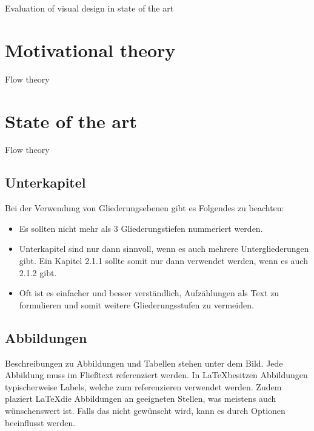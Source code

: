 Evaluation of visual design in state of the art

\section{Motivational theory}

Flow theory

\section{State of the art}

Flow theory

\subsection{Unterkapitel}

Bei der Verwendung von Gliederungsebenen gibt es Folgendes zu beachten:
\begin{itemize}
	\item Es sollten nicht mehr als 3 Gliederungstiefen nummeriert werden.
	\item Unterkapitel sind nur dann sinnvoll, wenn es auch mehrere Untergliederungen gibt. Ein Kapitel 2.1.1 sollte somit nur dann verwendet werden, wenn es auch 2.1.2 gibt.
	\item Oft ist es einfacher und besser verständlich, Aufzählungen als Text zu formulieren und somit weitere Gliederungsstufen zu vermeiden.
\end{itemize}

\subsection{Abbildungen}
\label{sec:abbildungen}

Beschreibungen zu Abbildungen und Tabellen stehen unter dem Bild. Jede Abbildung muss im Fließtext referenziert werden. In \LaTeX besitzen Abbildungen typischerweise Labels, welche zum referenzieren verwendet werden. Zudem plaziert \LaTeX die Abbildungen an geeigneten Stellen, was meistens auch wünschenswert ist. Falls das nicht gewünscht wird, kann es durch Optionen beeinflusst werden.

